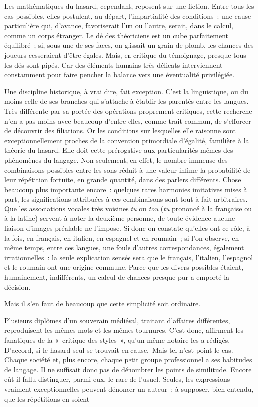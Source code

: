\documentclass[french,twoside]{book} %
\begin{document}
Les mathématiques du hasard, cependant, reposent sur une fiction. Entre tous les cas possibles, elles postulent, au départ, l’impartialité des conditions : une cause particulière qui, d’avance, favoriserait l’un ou l’autre, serait, dans le calcul, comme un corps étranger. Le dé des théori­ciens est un cube parfaitement équilibré ; si, sous une de ses faces, on glissait un grain de plomb, les chances des joueurs cesseraient d’être égales. Mais, en critique du témoignage, presque tous les dés sont pipés. Car des éléments humains très délicats interviennent constamment pour faire pencher la balance vers une éventualité privilégiée.\par
Une discipline historique, à vrai dire, fait exception. C’est la linguis­tique, ou du moins celle de ses branches qui s’attache à établir les parentés entre les langues. Très différente par sa portée des opérations proprement critiques, cette recherche n’en a pas moins avec beaucoup d’entre elles, comme trait commun, de s’efforcer de découvrir des filiations. Or les conditions sur lesquelles elle raisonne sont exceptionnellement proches de la convention primordiale d’égalité, familière à la théorie du hasard. Elle doit cette prérogative aux particularités mêmes des phénomènes du langage. Non seulement, en effet, le nombre immense des combinaisons possibles entre les sons réduit à une valeur infime la probabilité de leur répétition fortuite, en grande quantité, dans des parlers différents. Chose beaucoup plus importante encore : quelques rares harmonies imitatives mises à part, les significations attribuées à ces combinaisons sont tout à fait arbitraires. Que les associations vocales très voisines \emph{tu} ou \emph{tou} (\emph{tu} prononcé à la française ou à la latine) servent à noter la deuxième per­sonne, de toute évidence aucune liaison d’images préalable ne l’impose. Si donc on constate qu’elles ont ce rôle, à la fois, en français, en italien, en espagnol et en roumain ; si l’on observe, en même temps, entre ces langues, une foule d’autres correspondances, également irrationnelles : la seule explication sensée sera que le français, l’italien, l’espagnol et le roumain ont une origine commune. Parce que les divers possibles étaient, humainement, indifférents, un calcul de chances presque pur a emporté la décision.\par
Mais il s’en faut de beaucoup que cette simplicité soit ordinaire.\par
Plusieurs diplômes d’un souverain médiéval, traitant d’affaires différentes, reproduisent les mêmes mots et les mêmes tournures. C’est donc, affirment les fanatiques de la « critique des styles », qu’un même notaire les a rédigés. D’accord, si le hasard seul se trouvait en cause. Mais tel n’est point le cas. Chaque société et, plus encore, chaque petit groupe professionnel a ses habitudes de langage. Il ne suffisait donc pas de dénombrer les points de similitude. Encore eût‑il fallu distinguer, parmi eux, le rare de l’usuel. Seules, les expressions vraiment exceptionnelles peuvent dénoncer un auteur : à supposer, bien entendu, que les répétitions en soient  
\end{document}
